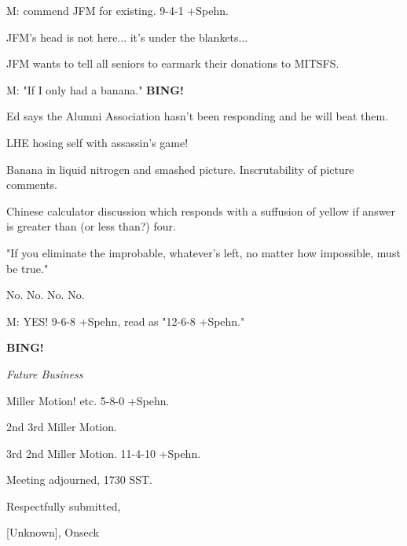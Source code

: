 \documentclass[12pt]{article}
\newcommand{\bing}{{\bf BING!} }
\newcommand{\goto}[1]{\bing \vskip 12pt \centerline{{\em{#1}}}}
\begin{document}
M: commend JFM for existing. 9-4-1 +Spehn.

JFM's head is not here... it's under the blankets...

JFM wants to tell all seniors to earmark their donations to MITSFS.

M: "If I only had a banana." \bing

Ed says the Alumni Association hasn't been responding and he will beat them.

LHE hosing self with assassin's game!

Banana in liquid nitrogen and smashed picture. Inscrutability of picture comments.

Chinese calculator discussion which responds with a suffusion of yellow if answer is greater than (or less than?) four.

"If you eliminate the improbable, whatever's left, no matter how impossible, must be true."

No. No. No. No.

M: YES! 9-6-8 +Spehn, read as "12-6-8 +Spehn."

\goto{Future Business}

Miller Motion! etc. 5-8-0 +Spehn.

2nd 3rd Miller Motion.

3rd 2nd Miller Motion. 11-4-10 +Spehn.

\vspace{12pt}

\noindent
Meeting adjourned, 1730 SST.

\vspace{18pt}

\centerline{Respectfully submitted,}
\centerline{[Unknown], Onseck}
\end{document}
